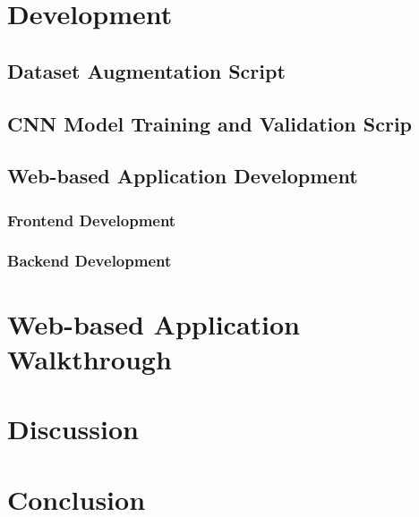 \documentclass{BachelorBUI}
\begin{document}
\section{Development}
    \subsection{Dataset Augmentation Script}
    \subsection{CNN Model Training and Validation Scrip}
    \subsection{Web-based Application Development}
        \subsubsection{Frontend Development}
        \subsubsection{Backend Development}

\section{Web-based Application Walkthrough}

\section{Discussion}

\section{Conclusion}

\clearpage
\printbibliography
\end{document}
